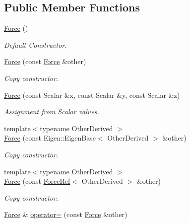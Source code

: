 \subsection*{Public Member Functions}
\begin{DoxyCompactItemize}
\item 
\hyperlink{classow__core_1_1Force_ab6ef4b86db1e7e9a6f87ec6f71eb6d70}{Force} ()\hypertarget{classow__core_1_1Force_ab6ef4b86db1e7e9a6f87ec6f71eb6d70}{}\label{classow__core_1_1Force_ab6ef4b86db1e7e9a6f87ec6f71eb6d70}

\begin{DoxyCompactList}\small\item\em Default Constructor. \end{DoxyCompactList}\item 
\hyperlink{classow__core_1_1Force_a21bb6a92dd68c6ac838c13ce99fcf37e}{Force} (const \hyperlink{classow__core_1_1Force}{Force} \&other)\hypertarget{classow__core_1_1Force_a21bb6a92dd68c6ac838c13ce99fcf37e}{}\label{classow__core_1_1Force_a21bb6a92dd68c6ac838c13ce99fcf37e}

\begin{DoxyCompactList}\small\item\em Copy constructor. \end{DoxyCompactList}\item 
\hyperlink{classow__core_1_1Force_a59f02d31c749b20c4d8f9a75c12648bd}{Force} (const Scalar \&x, const Scalar \&y, const Scalar \&z)\hypertarget{classow__core_1_1Force_a59f02d31c749b20c4d8f9a75c12648bd}{}\label{classow__core_1_1Force_a59f02d31c749b20c4d8f9a75c12648bd}

\begin{DoxyCompactList}\small\item\em Assignment from Scalar values. \end{DoxyCompactList}\item 
{\footnotesize template$<$typename Other\+Derived $>$ }\\\hyperlink{classow__core_1_1Force_a18c51f9e8b1fa8dbeada59438110aa97}{Force} (const Eigen\+::\+Eigen\+Base$<$ Other\+Derived $>$ \&other)
\begin{DoxyCompactList}\small\item\em Copy constructor. \end{DoxyCompactList}\item 
{\footnotesize template$<$typename Other\+Derived $>$ }\\\hyperlink{classow__core_1_1Force_ac3920ba88ad32026fff41e626bbaff7f}{Force} (const \hyperlink{classow__core_1_1ForceRef}{Force\+Ref}$<$ Other\+Derived $>$ \&other)
\begin{DoxyCompactList}\small\item\em Copy constructor. \end{DoxyCompactList}\item 
\hyperlink{classow__core_1_1Force}{Force} \& \hyperlink{classow__core_1_1Force_ab55228bb92b212e33b92deab588b1858}{operator=} (const \hyperlink{classow__core_1_1Force}{Force} \&other)\hypertarget{classow__core_1_1Force_ab55228bb92b212e33b92deab588b1858}{}\label{classow__core_1_1Force_ab55228bb92b212e33b92deab588b1858}


\end{DoxyCompactItemize}
